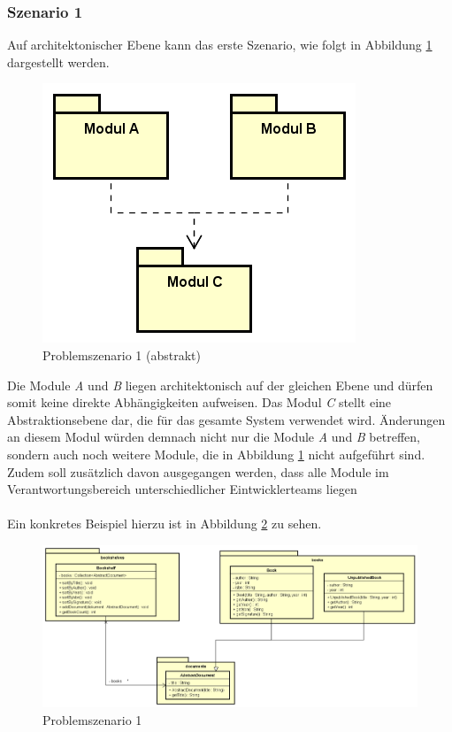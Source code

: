 \documentclass[11pt, 
ngerman,
doublespacing,
chapterinoneline, %
consistentlayout, %
]{scrartcl}
\begin{document}
\subsubsection{Szenario 1}\label{prob1}
Auf architektonischer Ebene kann das erste Szenario, wie folgt in Abbildung \ref{fig:problem} dargestellt werden.
\begin{figure}[h]
  \centering
  \includegraphics[scale = 0.7]{pics/problemS1Abstrakt.png}
  \caption{Problemszenario 1 (abstrakt)}
  \label{fig:problem}
\end{figure}
Die Module \emph{A} und \emph{B} liegen architektonisch auf der gleichen Ebene und dürfen somit keine direkte Abhängigkeiten aufweisen. Das Modul \emph{C} stellt eine Abstraktionsebene dar, die für das gesamte System verwendet wird. Änderungen an diesem Modul würden demnach nicht nur die Module \emph{A} und \emph{B} betreffen, sondern auch noch weitere Module, die in Abbildung \ref{fig:problem} nicht aufgeführt sind. Zudem soll zusätzlich davon ausgegangen werden, dass alle Module im Verantwortungsbereich unterschiedlicher Eintwicklerteams liegen\\\\
Ein konkretes Beispiel hierzu ist in Abbildung \ref{fig:problem1Konkret} zu sehen.
\begin{figure}[h]
  \centering
  \includegraphics[scale = 0.3]{pics/problemS1Konkret.png}
  \caption{Problemszenario 1}
  \label{fig:problem1Konkret}
\end{figure}\\
\end{document}
